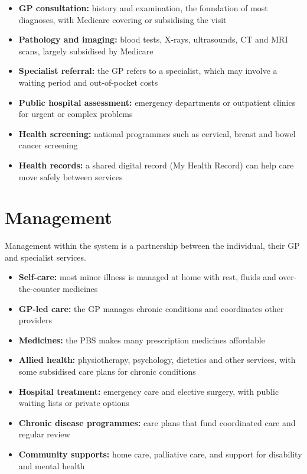 \begin{itemize}
    \item \textbf{GP consultation:} history and examination, the foundation of most diagnoses, with Medicare covering or subsidising the visit
    \item \textbf{Pathology and imaging:} blood tests, X-rays, ultrasounds, CT and MRI scans, largely subsidised by Medicare
    \item \textbf{Specialist referral:} the GP refers to a specialist, which may involve a waiting period and out-of-pocket costs
    \item \textbf{Public hospital assessment:} emergency departments or outpatient clinics for urgent or complex problems
    \item \textbf{Health screening:} national programmes such as cervical, breast and bowel cancer screening
    \item \textbf{Health records:} a shared digital record (My Health Record) can help care move safely between services
\end{itemize}

\section*{Management}
Management within the system is a partnership between the individual, their GP and specialist services.

\begin{itemize}
    \item \textbf{Self-care:} most minor illness is managed at home with rest, fluids and over-the-counter medicines
    \item \textbf{GP-led care:} the GP manages chronic conditions and coordinates other providers
    \item \textbf{Medicines:} the PBS makes many prescription medicines affordable
    \item \textbf{Allied health:} physiotherapy, psychology, dietetics and other services, with some subsidised care plans for chronic conditions
    \item \textbf{Hospital treatment:} emergency care and elective surgery, with public waiting lists or private options
    \item \textbf{Chronic disease programmes:} care plans that fund coordinated care and regular review
    \item \textbf{Community supports:} home care, palliative care, and support for disability and mental health
\end{itemize}

